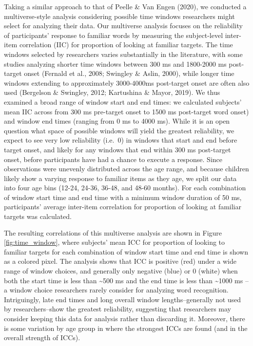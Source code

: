 \documentclass[10pt, letterpaper]{article}
\begin{document}
Taking a similar approach to that of Peelle \& Van Engen (2020), we
conducted a multiverse-style analysis considering possible time windows
researchers might select for analyzing their data. Our multiverse
analysis focuses on the reliability of participants' response to
familiar words by measuring the subject-level inter-item correlation
(IIC) for proportion of looking at familiar targets. The time windows
selected by researchers varies substantially in the literature, with
some studies analyzing shorter time windows between 300 ms and 1800-2000
ms post-target onset (Fernald et al., 2008; Swingley \& Aslin, 2000),
while longer time windows extending to approximately 3000-4000ms
post-target onset are often also used (Bergelson \& Swingley, 2012;
Kartushina \& Mayor, 2019). We thus examined a broad range of window
start and end times: we calculated subjects' mean IIC across from 300 ms
pre-target onset to 1500 ms post-target word onset) and window end times
(ranging from 0 ms to 4000 ms). While it is an open question what space
of possible windows will yield the greatest reliability, we expect to
see very low reliability (i.e.~0) in windows that start and end before
target onset, and likely for any windows that end within 300 ms
post-target onset, before participants have had a chance to execute a
response. Since observations were unevenly distributed across the age
range, and because children likely show a varying response to familiar
items as they age, we split our data into four age bins (12-24, 24-36,
36-48, and 48-60 months). For each combination of window start time and
end time with a minimum window duration of 50 ms, participants' average
inter-item correlation for proportion of looking at familiar targets was
calculated.

The resulting correlations of this multiverse analysis are shown in
Figure \ref{fig:time_window}, where subjects' mean ICC for proportion of
looking to familiar targets for each combination of window start time
and end time is shown as a colored pixel. The analysis shows that ICC is
positive (red) under a wide range of window choices, and generally only
negative (blue) or 0 (white) when both the start time is less than
\textasciitilde500 ms and the end time is less than \textasciitilde1000
ms -- a window choice researchers rarely consider for analyzing word
recognition. Intriguingly, late end times and long overall window
lengths--generally not used by researchers--show the greatest
reliability, suggesting that researchers may consider keeping this data
for analysis rather than discarding it. Moreover, there is some
variation by age group in where the strongest ICCs are found (and in the
overall strength of ICCs).
\end{document}
